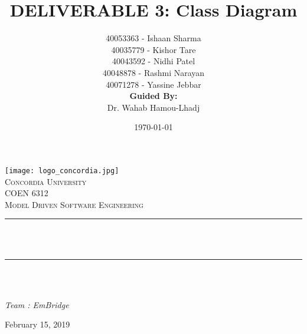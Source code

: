 \documentclass[12pt,a4paper]{article}
\title{DELIVERABLE 3: Class Diagram
		\\\vspace{.6cm}
	}								%
\author{
	 40053363 - Ishaan Sharma\\
	 40035779 - Kishor Tare\\
	 40043592 - Nidhi Patel\\
	 40048878 - Rashmi Narayan\\
     40071278 - Yassine Jebbar \\
     \newline\vspace{0.5 cm}
     \textbf{Guided By:}\\\qquad Dr. Wahab Hamou-Lhadj
	}								%
\date{\today}											%
\makeatletter
\let\thetitle\@title
\let\theauthor\@author
\makeatother
\begin{document}

\begin{titlepage}
	\centering
    \texttt{[image: logo\_concordia.jpg]}\\[1.0 cm]	%
    \textsc{\LARGE Concordia University}\\[2.0 cm]	%
	\textsc{\Large COEN 6312}\\[0.5 cm]				%
	\textsc{\large Model Driven Software Engineering}\\[0.5 cm]				%
	\rule{\linewidth}{0.2 mm} \\[0.4 cm]
	{ \huge \bfseries \thetitle}\\
	\rule{\linewidth}{0.2 mm} \\[1.5 cm]

		\begin{flushleft} \large\\[0.1 cm]
			\textit{Team : EmBridge}\\[0.5 cm]
		
			\theauthor
		\end{flushleft}
	\vspace{2cm}
    
	{\large February 15, 2019}\\[2 cm]

	\vfill

\end{titlepage}

\thispagestyle{empty}

\tableofcontents
\begingroup
\let\clearpage\relax
\listoffigures
\begingroup
\let\clearpage\relax
\listoftables
\endgroup
\endgroup


\pagebreak

\end{document}
